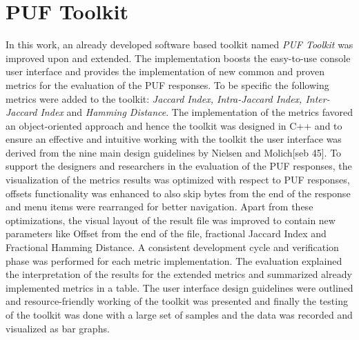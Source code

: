 \section{PUF Toolkit}
In this work, an already developed software based toolkit named \emph{PUF Toolkit} was improved upon and extended. The implementation boosts the easy-to-use console user interface and provides the implementation of new common and proven metrics for the evaluation of the PUF responses. To be specific the following metrics were added to the toolkit: \emph{Jaccard Index, Intra-Jaccard Index, Inter-Jaccard Index} and \emph{Hamming Distance}. The implementation of the metrics favored an
object-oriented approach and hence the toolkit was designed in C++ and to ensure an effective and intuitive working with the toolkit the user interface was derived from the nine main design guidelines by Nielsen and Molich[seb 45]. To support the designers and researchers in the evaluation of the PUF responses, the visualization of the metrics results was optimized with respect to PUF responses, offsets functionality was enhanced to also skip bytes from the end of the response and menu items were rearranged for better navigation. Apart from
these optimizations, the visual layout of the result file was improved to contain new parameters like Offset from the end of the file, fractional Jaccard Index and Fractional Hamming Distance. A consistent development cycle and verification phase was performed for each metric implementation. The evaluation explained the interpretation of the results for the extended metrics and summarized already implemented metrics in a table. The user interface design guidelines were outlined
and resource-friendly working of the toolkit was presented and finally the testing of the toolkit was done with a large set of samples and the data was recorded and visualized as bar graphs.\\


